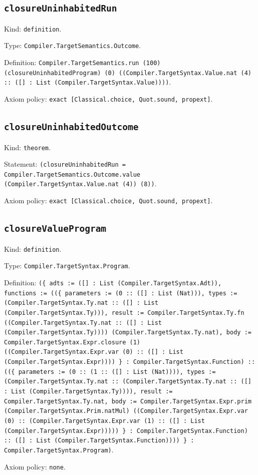\documentclass[11pt]{article}
\begin{document}
\subsection*{\texttt{closureUninhabitedRun}}
\noindent Kind: \texttt{definition}.\par
\noindent Type: \texttt{Compiler.TargetSemantics.Outcome}.\par
\noindent Definition: \texttt{Compiler.TargetSemantics.run (100) (closureUninhabitedProgram) (0) ((Compiler.TargetSyntax.Value.nat (4) :: ([] : List (Compiler.TargetSyntax.Value))))}.\par
\noindent Axiom policy: \texttt{exact [Classical.choice, Quot.sound, propext]}.\par
\subsection*{\texttt{closureUninhabitedOutcome}}
\noindent Kind: \texttt{theorem}.\par
\noindent Statement: \texttt{(closureUninhabitedRun = Compiler.TargetSemantics.Outcome.value (Compiler.TargetSyntax.Value.nat (4)) (8))}.\par
\noindent Axiom policy: \texttt{exact [Classical.choice, Quot.sound, propext]}.\par
\subsection*{\texttt{closureValueProgram}}
\noindent Kind: \texttt{definition}.\par
\noindent Type: \texttt{Compiler.TargetSyntax.Program}.\par
\noindent Definition: \texttt{(\{ adts := ([] : List (Compiler.TargetSyntax.Adt)), functions := ((\{ parameters := (0 :: ([] : List (Nat))), types := (Compiler.TargetSyntax.Ty.nat :: ([] : List (Compiler.TargetSyntax.Ty))), result := Compiler.TargetSyntax.Ty.fn ((Compiler.TargetSyntax.Ty.nat :: ([] : List (Compiler.TargetSyntax.Ty)))) (Compiler.TargetSyntax.Ty.nat), body := Compiler.TargetSyntax.Expr.closure (1) ((Compiler.TargetSyntax.Expr.var (0) :: ([] : List (Compiler.TargetSyntax.Expr)))) \} : Compiler.TargetSyntax.Function) :: ((\{ parameters := (0 :: (1 :: ([] : List (Nat)))), types := (Compiler.TargetSyntax.Ty.nat :: (Compiler.TargetSyntax.Ty.nat :: ([] : List (Compiler.TargetSyntax.Ty)))), result := Compiler.TargetSyntax.Ty.nat, body := Compiler.TargetSyntax.Expr.prim (Compiler.TargetSyntax.Prim.natMul) ((Compiler.TargetSyntax.Expr.var (0) :: (Compiler.TargetSyntax.Expr.var (1) :: ([] : List (Compiler.TargetSyntax.Expr))))) \} : Compiler.TargetSyntax.Function) :: ([] : List (Compiler.TargetSyntax.Function)))) \} : Compiler.TargetSyntax.Program)}.\par
\noindent Axiom policy: \texttt{none}.\par
\end{document}
